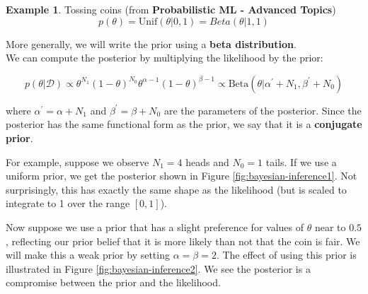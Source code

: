 \documentclass[12pt, a4paper]{article}
\theoremstyle{definition}
\newtheorem{example}{Example}[section]
\numberwithin{figure}{section}
\numberwithin{equation}{section}
\numberwithin{table}{section}
\begin{document}
\begin{example}{Tossing coins (from \textbf{Probabilistic ML - Advanced Topics})}
\begin{equation}
    p(\theta) = \text{Unif}(\theta | 0, 1) = Beta(\theta|1,1)
\end{equation}

More generally, we will write the prior using a \textbf{beta distribution}.\\
%
%
%

We can compute the posterior by multiplying the likelihood by the prior:

\begin{equation}
p(\theta | \mathcal{D}) \propto \theta^{N_1} (1 - \theta)^{N_0} \theta^{\alpha - 1} (1 - \theta)^{\beta - 1}
    \propto \text{Beta}(\theta | \alpha^{'} + N_1, \beta^{'} + N_0)
\end{equation}

where $\alpha^{'}=\alpha + N_1$ and $\beta^{'}=\beta + N_0$ are the parameters of the posterior. Since the posterior has the same functional form as the prior, we say that it is a \textbf{conjugate prior}.

For example, suppose we observe $N_1 = 4$ heads and $N_0 = 1$ tails. If we use a uniform prior, we get the posterior shown in Figure \ref{fig:bayesian-inference1}. Not surprisingly, this has exactly the same shape as the likelihood (but is scaled to integrate to 1 over the range $[0, 1]$).


Now suppose we use a prior that has a slight preference for values of $\theta$ near to $0.5$, reflecting our prior belief that it is more likely than not that the coin is fair. We will make this a weak prior by setting $\alpha = \beta = 2$. The effect of using this prior is illustrated in Figure \ref{fig:bayesian-inference2}. We see the posterior is a compromise between the prior and the likelihood.



\end{example}
\end{document}
